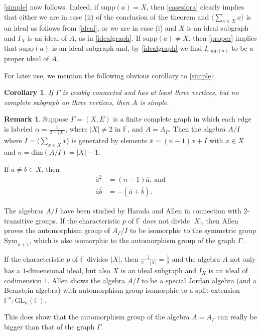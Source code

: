 \documentclass[oneside,a4paper]{amsart} %
\newtheorem{corollary}[proposition]{Corollary}
\theoremstyle{definition}
\newtheorem{remark}[proposition]{Remark}
\begin{document}
\cref{simple} now  follows.
Indeed, if $\mathrm{supp}(a)=X$, then \cref{casesfora} clearly implies that either we are in case (ii) of the conclusion of the theorem and $\langle \sum_{x\in X}x\rangle$ is an ideal as follows from \cref{ideal},
or we are in case (i) and $X$ is an ideal subgraph and $I_X$ is an ideal of $A$, as in \cref{idealgraph}.
If $\mathrm{supp}(a)\neq X$, then \cref{proper} implies that $\mathrm{supp}(a)$ is an ideal subgraph and, 
by \cref{idealgraph} we find $I_{\mathrm{supp}(a)}$ to be a proper ideal of $A$.

For later use, we mention the following obvious corollary to \cref{simple}:

\begin{corollary}\label{simplecor}
If $\Gamma$ is weakly connected and has  at least three vertices, but no complete subgraph on three vertices,
then $A$ is simple.
\end{corollary}



\begin{remark}\label{allen}
Suppose $\Gamma=(X,E)$ is a finite complete graph in which each edge is labeled $\alpha=\frac{1}{2-|X|}$, where $|X|\neq 2$ in $\mathbb{F}$,
and $A=A_\Gamma$.
Then the algebra $A/I$ where $I=\langle\displaystyle \sum_{x\in X} x\rangle$
is generated by elements $\overline{x}=(n-1)x+I$ with $x\in X$ and $n=\mathrm{dim}(A/I)=|X|-1$.

If $a\neq b\in X$, then 
$$\begin{array}{ll}
\overline{a}^2&= (n-1)\overline{a},\ \mathrm{and}\\
\overline{a}\overline{b}&=-(\overline{a}+\overline{b}).
\end{array}$$

The algebras $A/I$ have been studied by Harada \cite{harada} and Allen \cite{allen1,allen2} in connection with $2$-transitive groups. 
If the characteristic $p$ of $\mathbb{F}$ does not divide $|X|$, then Allen proves the automorphism group of $A_\Gamma/I$ to be isomorphic 
to the symmetric group $\mathrm{Sym}_{n+1}$, which is also isomorphic to the automorphism group of the graph $\Gamma$.

If  the characteristic $p$ of $\mathbb{F}$ divides $|X|$, then $\frac{1}{2-|X|}=\frac{1}{2}$ and the algebra $A$ not only has a $1$-dimensional ideal,
but also $X$ is an ideal subgraph and $I_X$ is an ideal of codimension $1$.
Allen \cite{allen1,allen2} shows the algebra $A/I$ to be a special Jordan algebra (and   a Bernstein algebra)
with automorphism group isomorphic to a split extension $\mathbb{F}^n:\mathrm{GL}_n(\mathbb{F})$.

This does show that the automorphism group of the algebra $A=A_\Gamma$ can really be bigger than that of the graph $\Gamma$.
\end{remark}
\end{document}
